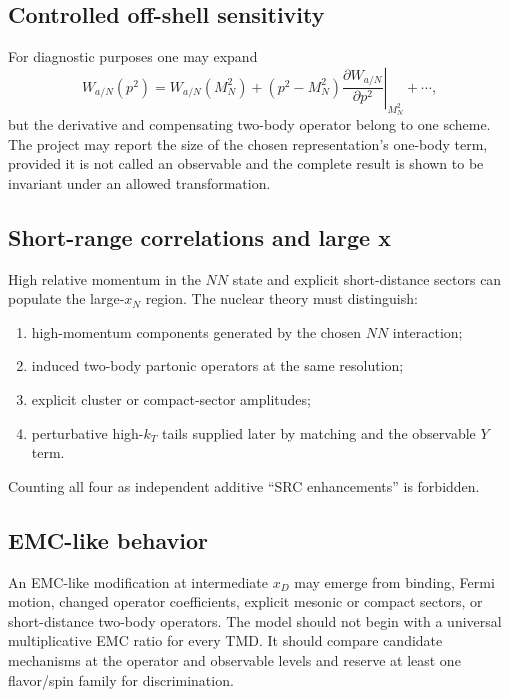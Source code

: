 \documentclass[11pt]{article}
\begin{document}
\subsection{Controlled off-shell sensitivity}

For diagnostic purposes one may expand
\begin{equation}
 W_{a/N}(p^2)
 =W_{a/N}(M_N^2)
 +(p^2-M_N^2)
 \left.\frac{\partial W_{a/N}}{\partial p^2}\right|_{M_N^2}
 +\cdots,
\label{eq:offshell-expansion}
\end{equation}
but the derivative and compensating two-body operator belong to one scheme.
The project may report the size of the chosen representation's one-body
term, provided it is not called an observable and the complete result is
shown to be invariant under an allowed transformation.

\subsection{Short-range correlations and large x}

High relative momentum in the \(NN\) state and explicit short-distance
sectors can populate the large-\(x_N\) region.  The nuclear theory must
distinguish:
\begin{enumerate}
\item high-momentum components generated by the chosen \(NN\) interaction;
\item induced two-body partonic operators at the same resolution;
\item explicit cluster or compact-sector amplitudes;
\item perturbative high-\(k_T\) tails supplied later by matching and the
      observable \(Y\) term.
\end{enumerate}
Counting all four as independent additive ``SRC enhancements'' is forbidden.

\subsection{EMC-like behavior}

An EMC-like modification at intermediate \(x_D\) may emerge from binding,
Fermi motion, changed operator coefficients, explicit mesonic or compact
sectors, or short-distance two-body operators.  The model should not begin
with a universal multiplicative EMC ratio for every TMD.  It should compare
candidate mechanisms at the operator and observable levels and reserve at
least one flavor/spin family for discrimination.
\end{document}
